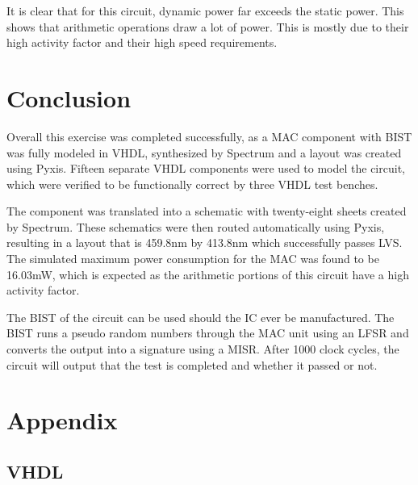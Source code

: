 \documentclass[11pt]{article}
\begin{document}
		It is clear that for this circuit, dynamic power far exceeds the static power. This shows that arithmetic operations draw a lot of power. This is mostly due to their high activity factor and their high speed requirements.  

			

\section{Conclusion}

Overall this exercise was completed successfully, as a MAC component with BIST was fully modeled in VHDL, synthesized by Spectrum and a layout was created using Pyxis. Fifteen separate VHDL components were used to model the circuit, which were verified to be functionally correct by three VHDL test benches. 

The component was translated into a schematic with twenty-eight sheets created by Spectrum. These schematics were then routed automatically using Pyxis, resulting in a layout that is 459.8nm by 413.8nm which successfully passes LVS. The simulated maximum power consumption for the MAC was found to be 16.03mW, which is expected as the arithmetic portions of this circuit have a high activity factor.

The BIST of the circuit can be used should the IC ever be manufactured. The BIST runs a pseudo random numbers through the MAC unit using an LFSR and converts the output into a signature using a MISR. After 1000 clock cycles, the circuit will output that the test is completed and whether it passed or not. 


\section{Appendix}

	\subsection{VHDL}
	
		
		
		
		
		
		
		
		
\end{document}
